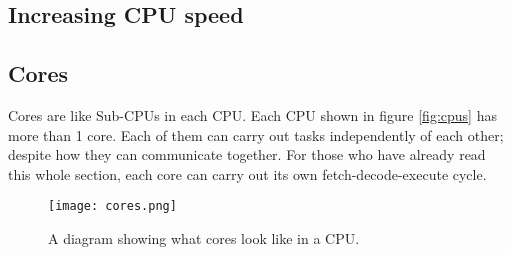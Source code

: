\documentclass[../main.tex]{subfiles}
\begin{document}
\subsection{Increasing CPU speed}

\subsection{Cores}

Cores are like Sub-CPUs in each CPU. Each CPU shown in figure \ref{fig:cpus} has more than 1 core. Each of them can carry out tasks independently of each other; despite how they can communicate together. For those who have already read this whole section, each core can carry out its own fetch-decode-execute cycle.

\begin{figure}[H]
    \centering
    \texttt{[image: cores.png]}
    \caption{A diagram showing what cores look like in a CPU.}
    \label{fig:cores}
\end{figure}
\end{document}
